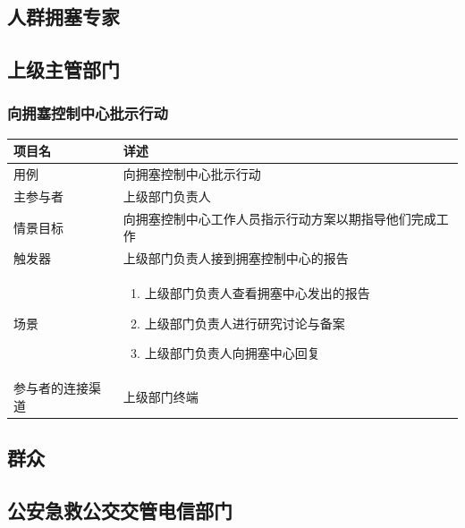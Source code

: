 \documentclass{ctexrep}
\begin{document}
\subsection{人群拥塞专家}
\subsection{上级主管部门}

\subsubsection{向拥塞控制中心批示行动}
\begin{longtable}{p{2cm} | p{10cm}}
\hline
项目名 & 详述 \\
\hline
\hline
用例 & 向拥塞控制中心批示行动 \\
\hline
主参与者 & 上级部门负责人 \\
\hline
情景目标 & 向拥塞控制中心工作人员指示行动方案以期指导他们完成工作  \\
\hline
触发器 & 上级部门负责人接到拥塞控制中心的报告 \\
\hline
场景 & \begin{enumerate}
	\item 上级部门负责人查看拥塞中心发出的报告
	\item 上级部门负责人进行研究讨论与备案
	\item 上级部门负责人向拥塞中心回复
\end{enumerate} \\
\hline
参与者的连接渠道 & 上级部门终端 \\
\hline
\end{longtable}

\subsection{群众}
\subsection{公安急救公交交管电信部门}
\end{document}
